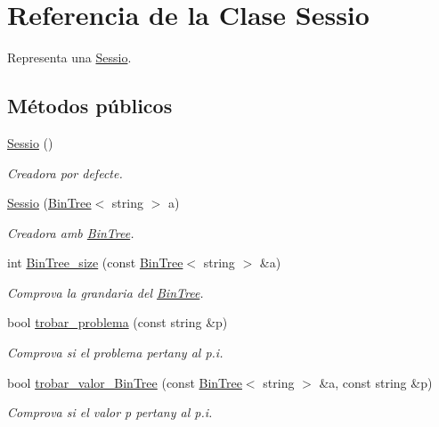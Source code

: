 \hypertarget{class_sessio}{}\section{Referencia de la Clase Sessio}
\label{class_sessio}


Representa una \mbox{\hyperlink{class_sessio}{Sessio}}.  


\subsection*{Métodos públicos}
\begin{DoxyCompactItemize}
\item 
\mbox{\hyperlink{class_sessio_a2aeda3ca0902761f07d837538244539b}{Sessio}} ()
\begin{DoxyCompactList}\small\item\em Creadora por defecte. \end{DoxyCompactList}\item 
\mbox{\hyperlink{class_sessio_a1520734be8dff0de8b3ee41dcc4ee05c}{Sessio}} (\mbox{\hyperlink{class_bin_tree}{Bin\+Tree}}$<$ string $>$ a)
\begin{DoxyCompactList}\small\item\em Creadora amb \mbox{\hyperlink{class_bin_tree}{Bin\+Tree}}. \end{DoxyCompactList}\item 
int \mbox{\hyperlink{class_sessio_a6334ccff8dba6a5ac16df5a56ec09359}{Bin\+Tree\+\_\+size}} (const \mbox{\hyperlink{class_bin_tree}{Bin\+Tree}}$<$ string $>$ \&a)
\begin{DoxyCompactList}\small\item\em Comprova la grandaria del \mbox{\hyperlink{class_bin_tree}{Bin\+Tree}}. \end{DoxyCompactList}\item 
bool \mbox{\hyperlink{class_sessio_acd23d7789cdca97a9cb88c766233b3bb}{trobar\+\_\+problema}} (const string \&p)
\begin{DoxyCompactList}\small\item\em Comprova si el problema pertany al p.\+i. \end{DoxyCompactList}\item 
bool \mbox{\hyperlink{class_sessio_abc46775610c66948c732061b3692d77d}{trobar\+\_\+valor\+\_\+\+Bin\+Tree}} (const \mbox{\hyperlink{class_bin_tree}{Bin\+Tree}}$<$ string $>$ \&a, const string \&p)
\begin{DoxyCompactList}\small\item\em Comprova si el valor {\itshape p} pertany al p.\+i. \end{DoxyCompactList}\item 

\end{DoxyCompactItemize}
